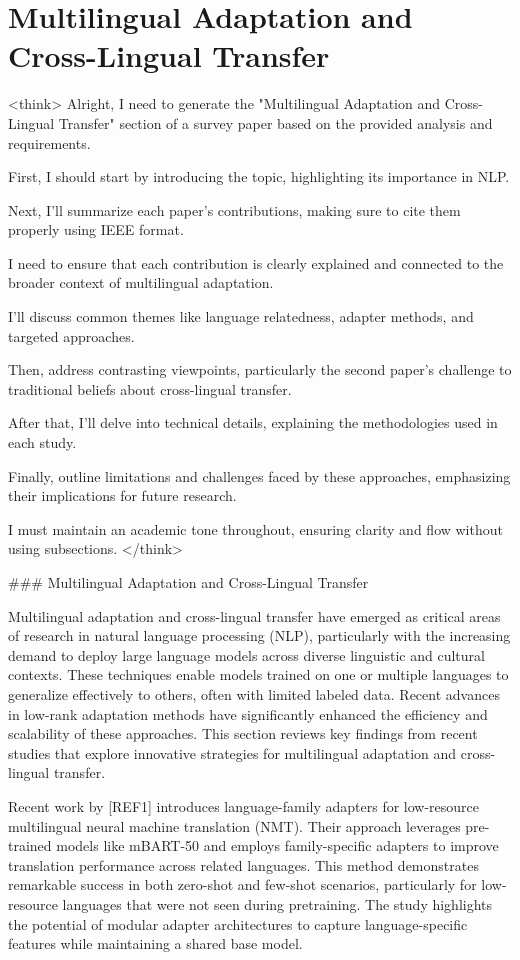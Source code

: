\documentclass[conference]{IEEEtran}
\begin{document}
\section{Multilingual Adaptation and Cross-Lingual Transfer}
<think>
Alright, I need to generate the "Multilingual Adaptation and Cross-Lingual Transfer" section of a survey paper based on the provided analysis and requirements.

First, I should start by introducing the topic, highlighting its importance in NLP.

Next, I'll summarize each paper's contributions, making sure to cite them properly using IEEE format. 

I need to ensure that each contribution is clearly explained and connected to the broader context of multilingual adaptation.

I'll discuss common themes like language relatedness, adapter methods, and targeted approaches.

Then, address contrasting viewpoints, particularly the second paper's challenge to traditional beliefs about cross-lingual transfer.

After that, I'll delve into technical details, explaining the methodologies used in each study.

Finally, outline limitations and challenges faced by these approaches, emphasizing their implications for future research.

I must maintain an academic tone throughout, ensuring clarity and flow without using subsections.
</think>

### Multilingual Adaptation and Cross-Lingual Transfer

Multilingual adaptation and cross-lingual transfer have emerged as critical areas of research in natural language processing (NLP), particularly with the increasing demand to deploy large language models across diverse linguistic and cultural contexts. These techniques enable models trained on one or multiple languages to generalize effectively to others, often with limited labeled data. Recent advances in low-rank adaptation methods have significantly enhanced the efficiency and scalability of these approaches. This section reviews key findings from recent studies that explore innovative strategies for multilingual adaptation and cross-lingual transfer.

Recent work by [REF1] introduces language-family adapters for low-resource multilingual neural machine translation (NMT). Their approach leverages pre-trained models like mBART-50 and employs family-specific adapters to improve translation performance across related languages. This method demonstrates remarkable success in both zero-shot and few-shot scenarios, particularly for low-resource languages that were not seen during pretraining. The study highlights the potential of modular adapter architectures to capture language-specific features while maintaining a shared base model.
\end{document}
